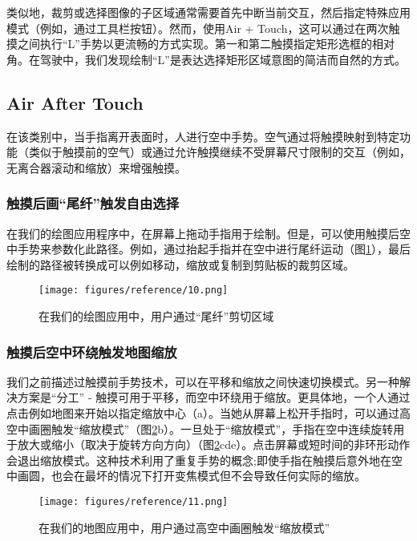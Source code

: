 类似地，裁剪或选择图像的子区域通常需要首先中断当前交互，然后指定特殊应用模式（例如，通过工具栏按钮）。然而，使用Air + Touch，这可以通过在两次触摸之间执行“L”手势以更流畅的方式实现。第一和第二触摸指定矩形选框的相对角。在驾驶中，我们发现绘制“L”是表达选择矩形区域意图的简洁而自然的方式。

\subsection{Air After Touch}

在该类别中，当手指离开表面时，人进行空中手势。空气通过将触摸映射到特定功能（类似于触摸前的空气）或通过允许触摸继续不受屏幕尺寸限制的交互（例如，无离合器滚动和缩放）来增强触摸。

\subsubsection{触摸后画“尾纤”触发自由选择}

在我们的绘图应用程序中，在屏幕上拖动手指用于绘制。但是，可以使用触摸后空中手势来参数化此路径。例如，通过抬起手指并在空中进行尾纤运动（图\ref{fig:ref_10}），最后绘制的路径被转换成可以例如移动，缩放或复制到剪贴板的裁剪区域。

\begin{figure}
\centering
\texttt{[image: figures/reference/10.png]}
\caption{在我们的绘图应用中，用户通过“尾纤”剪切区域}
\label{fig:ref_10}
\end{figure}

\subsubsection{触摸后空中环绕触发地图缩放}

我们之前描述过触摸前手势技术，可以在平移和缩放之间快速切换模式。另一种解决方案是“分工” - 触摸可用于平移，而空中环绕用于缩放。更具体地，一个人通过点击例如地图来开始以指定缩放中心（a）。当她从屏幕上松开手指时，可以通过高空中画圈触发“缩放模式”（图\ref{fig:ref_11}b）。一旦处于“缩放模式”，手指在空中连续旋转用于放大或缩小（取决于旋转方向方向）（图\ref{fig:ref_11}cde）。点击屏幕或短时间的非环形动作会退出缩放模式。这种技术利用了重复手势的概念;即使手指在触摸后意外地在空中画圆，也会在最坏的情况下打开变焦模式但不会导致任何实际的缩放。

\begin{figure}
\centering
\texttt{[image: figures/reference/11.png]}
\caption{在我们的地图应用中，用户通过高空中画圈触发“缩放模式”}
\label{fig:ref_11}
\end{figure}


